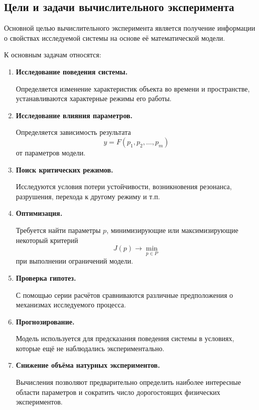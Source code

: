 \subsection{Цели и задачи вычислительного эксперимента}

Основной целью вычислительного эксперимента является получение информации о свойствах исследуемой системы на основе её математической модели.

К основным задачам относятся:

\begin{enumerate}
	\item \textbf{Исследование поведения системы.}
	
	Определяется изменение характеристик объекта во времени и пространстве, устанавливаются характерные режимы его работы.
	
	\item \textbf{Исследование влияния параметров.}
	
	Определяется зависимость результата
	\[
	y = F(p_1,p_2,\ldots,p_m)
	\]
	от параметров модели.
	
	\item \textbf{Поиск критических режимов.}
	
	Исследуются условия потери устойчивости, возникновения резонанса, разрушения, перехода к другому режиму и т.п.
	
	\item \textbf{Оптимизация.}
	
	Требуется найти параметры $p$, минимизирующие или максимизирующие некоторый критерий
	\[
	J(p)\rightarrow \min_{p\in P}
	\]
	при выполнении ограничений модели.
	
	\item \textbf{Проверка гипотез.}
	
	С помощью серии расчётов сравниваются различные предположения о механизмах исследуемого процесса.
	
	\item \textbf{Прогнозирование.}
	
	Модель используется для предсказания поведения системы в условиях, которые ещё не наблюдались экспериментально.
	
	\item \textbf{Снижение объёма натурных экспериментов.}
	
	Вычисления позволяют предварительно определить наиболее интересные области параметров и сократить число дорогостоящих физических экспериментов.
\end{enumerate}

